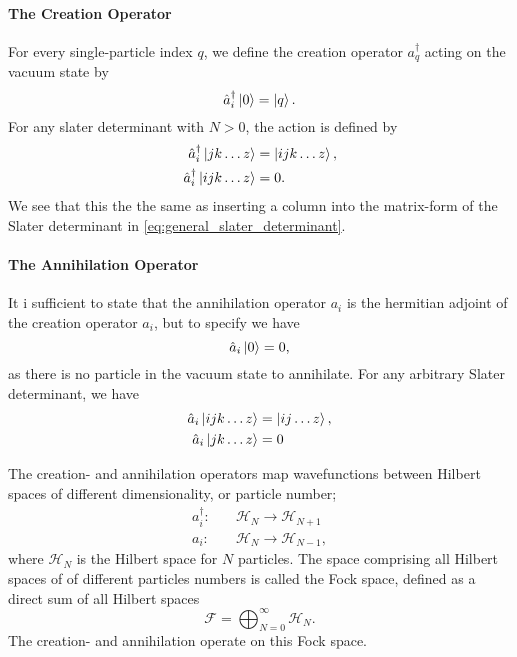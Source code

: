     \paragraph{The Creation Operator}
    For every single-particle index $q$,
    we define the creation operator
    $a_q^\dagger$ acting on the vacuum state by
    \begin{equation}
        \hat{a}_i^\dagger \ket{0} = \ket{q}.
    \end{equation}
    For any slater determinant with $N > 0$, the action is defined by
    \begin{align}
        \hat{a}_i^\dagger\ket{jk \dots z} &= \ket{ijk \dots z}, \\
        \hat{a}_i^\dagger\ket{ijk \dots z} &= 0.
    \end{align}
    We see that this the the same as inserting a column into the matrix-form of the 
    Slater determinant in \autoref{eq:general_slater_determinant}.

    \paragraph{The Annihilation Operator}
    It i sufficient to state that the 
    annihilation operator $a_i$ is the hermitian adjoint of the creation operator
    $\hat{a}_i$, but to specify we have
    \begin{equation}
        \hat{a}_i\ket{0} = 0,
    \end{equation}
    as there is no particle in the vacuum state to annihilate. 
    For any arbitrary Slater determinant, we have 
    \begin{align}
        \hat{a}_i \ket{ijk \dots z} &= \ket{ij \dots z}, \\
        \hat{a}_i \ket{jk \dots z} &= 0       
    \end{align}

    The creation- and annihilation operators map wavefunctions between Hilbert spaces of 
    different dimensionality, or particle number;
    \begin{align}
        a^\dagger_i: &\quad \mathcal{H}_N \to \mathcal{H}_{N+1} \\
        a_i: &\quad \mathcal{H}_N \to \mathcal{H}_{N-1},
    \end{align}
    where $\mathcal{H}_N$ is the Hilbert space for $N$ particles. The space comprising
    all Hilbert spaces of of different particles numbers is called the Fock space, defined 
    as a direct sum of all Hilbert spaces
    \begin{equation}
        \mathscr{F} = \bigoplus_{N=0}^\infty \mathcal{H}_N.
    \end{equation}
    The creation- and annihilation operate on this Fock space.


